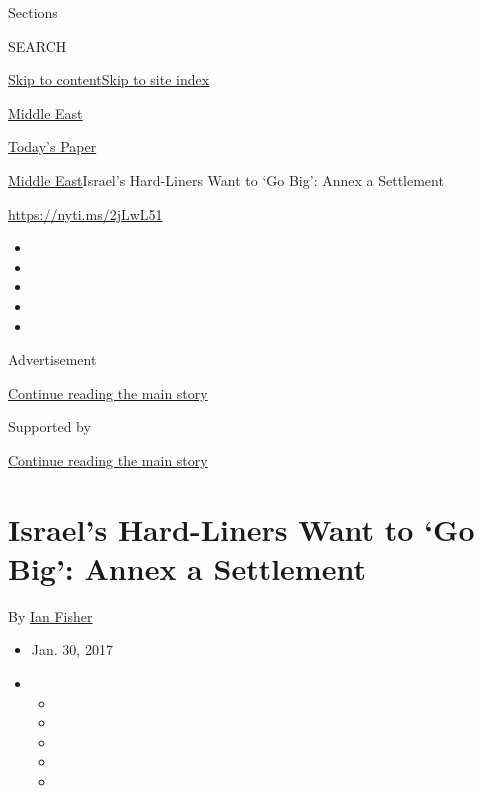 Sections

SEARCH

\protect\hyperlink{site-content}{Skip to
content}\protect\hyperlink{site-index}{Skip to site index}

\href{https://www.nytimes.com/section/world/middleeast}{Middle East}

\href{https://myaccount.nytimes.com/auth/login?response_type=cookie\&client_id=vi}{}

\href{https://www.nytimes.com/section/todayspaper}{Today's Paper}

\href{/section/world/middleeast}{Middle East}\textbar{}Israel's
Hard-Liners Want to `Go Big': Annex a Settlement

\url{https://nyti.ms/2jLwL51}

\begin{itemize}
\item
\item
\item
\item
\item
\end{itemize}

Advertisement

\protect\hyperlink{after-top}{Continue reading the main story}

Supported by

\protect\hyperlink{after-sponsor}{Continue reading the main story}

\hypertarget{israels-hard-liners-want-to-go-big-annex-a-settlement}{%
\section{Israel's Hard-Liners Want to `Go Big': Annex a
Settlement}\label{israels-hard-liners-want-to-go-big-annex-a-settlement}}

By \href{http://www.nytimes.com/by/ian-fisher}{Ian Fisher}

\begin{itemize}
\item
  Jan. 30, 2017
\item
  \begin{itemize}
  \item
  \item
  \item
  \item
  \item
  \end{itemize}
\end{itemize}

